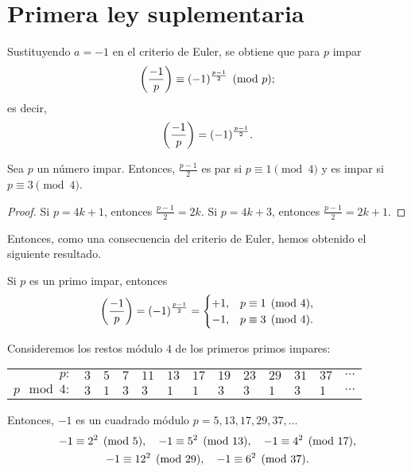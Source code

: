 \documentclass{article}
\theoremstyle{plain}
\begin{document}

\section{Primera ley suplementaria}

Sustituyendo $a = -1$ en el criterio de Euler, se obtiene que para $p$ impar
$$\left(\frac{-1}{p}\right) \equiv (-1)^{\frac{p-1}{2}} \pmod{p};$$
es decir,
$$\left(\frac{-1}{p}\right) = (-1)^{\frac{p-1}{2}}.$$

\begin{observacion}
  Sea $p$ un número impar. Entonces, $\frac{p-1}{2}$ es par si
  $p \equiv 1 \pmod{4}$ y es impar si $p \equiv 3 \pmod{4}$.

  \begin{proof}
    Si $p = 4k + 1$, entonces $\frac{p-1}{2} = 2k$. Si $p = 4k + 3$, entonces
    $\frac{p-1}{2} = 2k + 1$.
  \end{proof}
\end{observacion}

Entonces, como una consecuencia del criterio de Euler, hemos obtenido el
siguiente resultado.

\begin{proposicion}
  \label{prop:primera-ley-suplementaria}
  Si $p$ es un primo impar, entonces
  $$\left(\frac{-1}{p}\right) = (-1)^{\frac{p-1}{2}} = \begin{cases}
    +1, & p \equiv 1 \pmod{4},\\
    -1, & p \equiv 3 \pmod{4}.
  \end{cases}$$
\end{proposicion}

\begin{ejemplo}
  Consideremos los restos módulo $4$ de los primeros primos impares:
  \begin{center}
    \begin{tabular}{rx{0.5cm}x{0.5cm}x{0.5cm}x{0.5cm}x{0.5cm}x{0.5cm}x{0.5cm}x{0.5cm}x{0.5cm}x{0.5cm}x{0.5cm}c}
      \hline
      $p\colon$ & $3$ & $5$ & $7$ & $11$ & $13$ & $17$ & $19$ & $23$ & $29$ & $31$ & $37$ & $\cdots$ \tabularnewline
      $p\mod 4\colon$ & $3$ & $1$ & $3$ & $3$ & $1$ & $1$ & $3$ & $3$ & $1$ & $3$ & $1$ & $\cdots$ \tabularnewline
      \hline
    \end{tabular}
  \end{center}
  Entonces, $-1$ es un cuadrado módulo $p = 5, 13, 17, 29, 37, \ldots$
  \begin{gather*}
    -1 \equiv 2^2 \pmod{5}, \quad -1 \equiv 5^2 \pmod{13}, \quad -1 \equiv 4^2 \pmod{17},\\
    -1 \equiv 12^2 \pmod{29}, \quad -1 \equiv 6^2 \pmod{37}. \qedhere
  \end{gather*}
\end{ejemplo}
\end{document}
